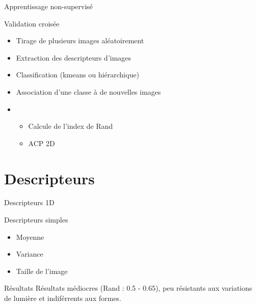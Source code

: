 \documentclass[xcolor=table]{beamer}
\begin{document}
	\begin{frame}{Apprentissage non-supervisé}
		\begin{block}{Validation croisée}
			\begin{itemize}
				\item Tirage de plusieurs images aléatoirement
				\item Extraction des descripteurs d'images
				\item Classification (kmeans ou hiérarchique)
				\item Association d'une classe à de nouvelles images
				\item 	\begin{itemize}
							\item Calcule de l'index de Rand
							\item ACP 2D
						\end{itemize}
			\end{itemize}
		\end{block}
	\end{frame}


\section{Descripteurs}

	\begin{frame}{Descripteurs 1D}
		\begin{block}{Descripteurs simples}
			\begin{itemize}
				\item Moyenne
				\item Variance
				\item Taille de l'image
			\end{itemize}
		\end{block}
		\begin{block}{Résultats}
			Résultats médiocres (Rand : 0.5 - 0.65), peu résistants aux variations de lumière et indiférrents aux formes.
		\end{block}
	\end{frame}
\end{document}
